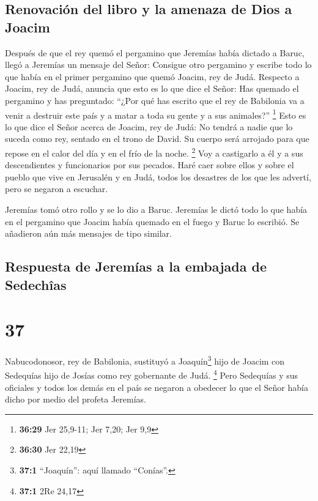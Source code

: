 \hypertarget{renovaciuxf3n-del-libro-y-la-amenaza-de-dios-a-joacim}{%
\subsection{Renovación del libro y la amenaza de Dios a
Joacim}\label{renovaciuxf3n-del-libro-y-la-amenaza-de-dios-a-joacim}}

 Después de que el rey quemó el pergamino que Jeremías
había dictado a Baruc, llegó a Jeremías un mensaje del Señor:
 Consigue otro pergamino y escribe todo lo que había en
el primer pergamino que quemó Joacim, rey de Judá. 
Respecto a Joacim, rey de Judá, anuncia que esto es lo que dice el
Señor: Has quemado el pergamino y has preguntado: ``¿Por qué has escrito
que el rey de Babilonia va a venir a destruir este país y a matar a toda
su gente y a sus animales?'' \footnote{\textbf{36:29} Jer 25,9-11; Jer
  7,20; Jer 9,9}  Esto es lo que dice el Señor acerca de
Joacim, rey de Judá: No tendrá a nadie que lo suceda como rey, sentado
en el trono de David. Su cuerpo será arrojado para que repose en el
calor del día y en el frío de la noche. \footnote{\textbf{36:30} Jer
  22,19}  Voy a castigarlo a él y a sus descendientes y
funcionarios por sus pecados. Haré caer sobre ellos y sobre el pueblo
que vive en Jerusalén y en Judá, todos los desastres de los que les
advertí, pero se negaron a escuchar.

 Jeremías tomó otro rollo y se lo dio a Baruc. Jeremías
le dictó todo lo que había en el pergamino que Joacim había quemado en
el fuego y Baruc lo escribió. Se añadieron aún más mensajes de tipo
similar.

\hypertarget{respuesta-de-jeremuxedas-a-la-embajada-de-sedechuxeeas}{%
\subsection{Respuesta de Jeremías a la embajada de
Sedechîas}\label{respuesta-de-jeremuxedas-a-la-embajada-de-sedechuxeeas}}

\hypertarget{section-36}{%
\section{37}\label{section-36}}

 Nabucodonosor, rey de Babilonia, sustituyó a
Joaquín\footnote{\textbf{37:1} ``Joaquín'': aquí llamado ``Conías''.}
hijo de Joacim con Sedequías hijo de Josías como rey gobernante de Judá.
\footnote{\textbf{37:1} 2Re 24,17}  Pero Sedequías y sus
oficiales y todos los demás en el país se negaron a obedecer lo que el
Señor había dicho por medio del profeta Jeremías.

